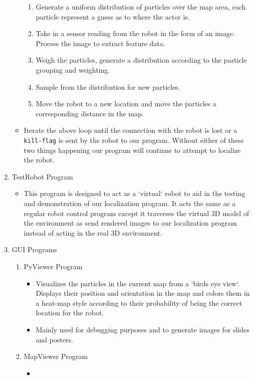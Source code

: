 \documentclass[a4paper,11pt]{article}
\begin{document}
\begin{enumerate}
\begin{itemize}
              \begin{enumerate}
                \item Generate a uniform distribution of particles over the map area, each particle represent a guess as to where the actor is.
                \item Take in a sensor reading from the robot in the form of an image. Process the image to extract feature data.
                \item Weigh the particles, generate a distribution according to the particle grouping and weighting.
                \item Sample from the distribution for new particles.
                \item Move the robot to a new location and move the particles a corresponding distance in the map.
              \end{enumerate}
            \item Iterate the above loop until the connection with the robot is lost or a \texttt{kill-flag} is sent by the robot to our program. Without either of these two things happening our program will continue to attempt to localize the robot.
            \end{itemize}
         \item TestRobot Program
	    \begin{itemize}
	     \item This program is designed to act as a `virtual` robot to aid in the testing and demonstration of our localization program. It acts the same as a regular robot control program except it traverses the virtual 3D model of the environment as send rendered images to our localization program instead of acting in the real 3D environment.
	    \end{itemize}
	 \item GUI Programs
	   \begin{enumerate}
	   \item PyViewer Program
	      \begin{itemize}
	      \item Visualizes the particles in the current map from a `birds eye view`. Displays their position and orientation in the map and colors them in a heat-map style according to their probability of being the correct location for the robot.
	      \item Mainly used for debugging purposes and to generate images for slides and posters.
	      \end{itemize}
	   \item MapViewer Program
	      \begin{itemize}
	      \item 
	      \end{itemize}
	    \end{enumerate} %
	    
	  \end{enumerate} %
        \newpage
\end{document}
